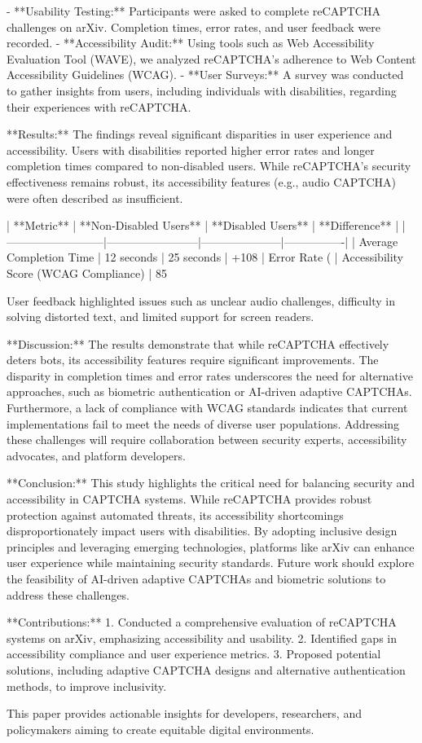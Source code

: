 - **Usability Testing:** Participants were asked to complete reCAPTCHA challenges on arXiv. Completion times, error rates, and user feedback were recorded.  
- **Accessibility Audit:** Using tools such as Web Accessibility Evaluation Tool (WAVE), we analyzed reCAPTCHA’s adherence to Web Content Accessibility Guidelines (WCAG).  
- **User Surveys:** A survey was conducted to gather insights from users, including individuals with disabilities, regarding their experiences with reCAPTCHA.  

**Results:**  
The findings reveal significant disparities in user experience and accessibility. Users with disabilities reported higher error rates and longer completion times compared to non-disabled users. While reCAPTCHA’s security effectiveness remains robust, its accessibility features (e.g., audio CAPTCHA) were often described as insufficient.

| **Metric**              | **Non-Disabled Users** | **Disabled Users** | **Difference** |
|--------------------------|------------------------|---------------------|----------------|
| Average Completion Time | 12 seconds            | 25 seconds          | +108%
| Error Rate (%
| Accessibility Score (WCAG Compliance) | 85%

User feedback highlighted issues such as unclear audio challenges, difficulty in solving distorted text, and limited support for screen readers.

**Discussion:**  
The results demonstrate that while reCAPTCHA effectively deters bots, its accessibility features require significant improvements. The disparity in completion times and error rates underscores the need for alternative approaches, such as biometric authentication or AI-driven adaptive CAPTCHAs. Furthermore, a lack of compliance with WCAG standards indicates that current implementations fail to meet the needs of diverse user populations. Addressing these challenges will require collaboration between security experts, accessibility advocates, and platform developers.

**Conclusion:**  
This study highlights the critical need for balancing security and accessibility in CAPTCHA systems. While reCAPTCHA provides robust protection against automated threats, its accessibility shortcomings disproportionately impact users with disabilities. By adopting inclusive design principles and leveraging emerging technologies, platforms like arXiv can enhance user experience while maintaining security standards. Future work should explore the feasibility of AI-driven adaptive CAPTCHAs and biometric solutions to address these challenges.

**Contributions:**  
1. Conducted a comprehensive evaluation of reCAPTCHA systems on arXiv, emphasizing accessibility and usability.  
2. Identified gaps in accessibility compliance and user experience metrics.  
3. Proposed potential solutions, including adaptive CAPTCHA designs and alternative authentication methods, to improve inclusivity.  

This paper provides actionable insights for developers, researchers, and policymakers aiming to create equitable digital environments.